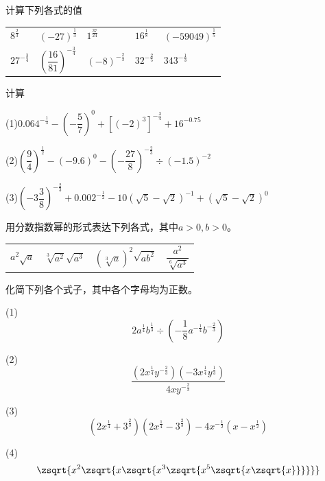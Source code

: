 \begin{exercise}计算下列各式的值
\begin{center}
      \begin{tabular}{lllll}
         \(8^{\frac{2}{3}}\)&$(-27)^{\frac{1}{3}}$&$1^{\frac{37}{24}}$&  \(16^{\frac{1}{8}}\)&\((-59049)^{\frac{1}{5}}\)\\
         \(27^{-\frac{3}{4}}\)&\((\dfrac{16}{81})^{-\frac{3}{4}}\)  &\((-8)^{-\frac{2}{3}}\) &\(32^{-\frac{2}{5}}\) &\(343^{-\frac{1}{3}}\)
        \end{tabular}
\end{center}
\end{exercise}

\begin{example}计算

    (1)\(0.064^{-\frac{1}{3}}-(-\dfrac{5}{7})^0+[(-2)^3]^{-\frac{3}{4}}+16^{-0.75}\)

    (2)\(\left(\dfrac{9}{4}\right)^\frac{1}{2}-(-9.6)^0-\left(-\dfrac{27}{8}\right)^{-\frac{2}{3}}\div (-1.5)^{-2}\)

    (3)$\left(-3\dfrac{3}{8}\right)^{-\frac{2}{3}}+0.002^{-\frac{1}{2}}-10(\sqrt{5}-\sqrt{2})^{-1}+(\sqrt{5}-\sqrt{2})^{0}$
    
\end{example}

\begin{exercise}用分数指数幂的形式表达下列各式，其中\(a>0, b>0 \)。
    \begin{center}
       \begin{tabular}{llll}
        \(a^2\sqrt{a}\) &\(\sqrt[3]{a^2}\sqrt{a^3}\)&\((\sqrt[3]{a})^2\sqrt{ab^2}\)&\(\dfrac{a^2}{\sqrt[6]{a^3}}\)
    \end{tabular}  
    \end{center}
\end{exercise}
\begin{example}
    化简下列各个式子，其中各个字母均为正数。

(1)\[2a^\frac{1}{4}b^\frac{1}{3}\div \left(-\frac{1}{8}a^{-\frac{1}{4}}b^{-\frac{2}{3}}\right)\]

(2)\[\frac{\left(2x^\frac{1}{4}y^{-\frac{2}{3}}\right)\left(-3x^\frac{1}{4}y^{\frac{1}{3}}\right)}{4xy^{-\frac{2}{3}}}\]

(3)\[\left(2x^{\frac{1}{4}}+3^\frac{2}{3}\right)\left(2x^{\frac{1}{4}}-3^\frac{2}{3}\right)-4x^{-\frac{1}{2}}\left(x-x^\frac{1}{2}\right)\]


(4)\[\zsqrt{x^2\zsqrt{x\zsqrt{x^3\zsqrt{x^5\zsqrt{x\zsqrt{x}}}}}}\]

\end{example}

